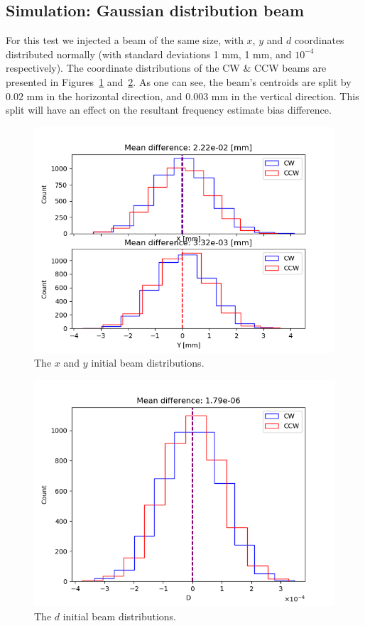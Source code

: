 \documentclass{article}
\begin{document}
\subsection{Simulation: Gaussian distribution beam}
For this test we injected a beam of the same size, with $x$, $y$ and $d$ coordinates distributed normally (with standard deviations 1 mm, 1 mm, and $10^{-4}$ respectively). The coordinate distributions of the CW \& CCW beams are presented in Figures~\ref{fig:Gauss_hists_XY} and~\ref{fig:Gauss_hists_D}. As one can see, the beam's centroids are split by $0.02$ mm in the horizontal direction, and $0.003$ mm in the vertical direction. This split will have an effect on the resultant frequency estimate bias difference.

\begin{figure}[!h]
  \centering
  \includegraphics[width=\linewidth]{img/spin_axis_motion/gaussian_beam_histograms_XY}
  \caption{The $x$ and $y$ initial beam distributions.\label{fig:Gauss_hists_XY}}
\end{figure}
\begin{figure}[!h]
  \centering
  \includegraphics[width=\linewidth]{img/spin_axis_motion/gaussian_beam_histograms_D}
  \caption{The $d$ initial beam distributions.\label{fig:Gauss_hists_D}}
\end{figure}
\end{document}

